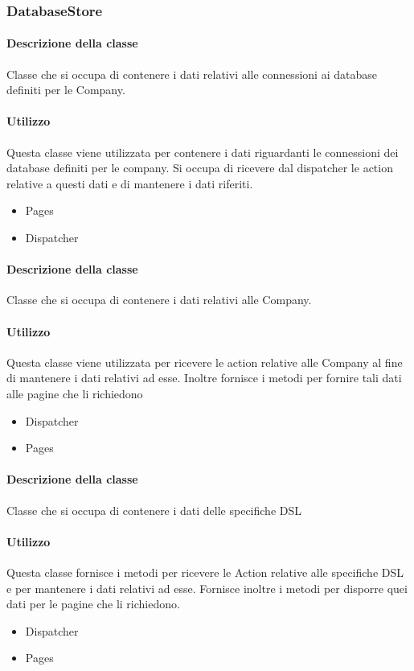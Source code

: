 \subsubsection{DatabaseStore}
\paragraph*{Descrizione della classe}
Classe che si occupa di contenere i dati relativi alle connessioni ai database definiti per le Company.
\paragraph*{Utilizzo}
Questa classe viene utilizzata per contenere i dati riguardanti le connessioni dei database definiti per le company. Si occupa di ricevere dal dispatcher le action relative a questi dati e di mantenere i dati riferiti.
\begin{itemize}
\item Pages
\item Dispatcher
\end{itemize}

\paragraph*{Descrizione della classe}
Classe che si occupa di contenere i dati relativi alle Company.
\paragraph*{Utilizzo}
Questa classe viene utilizzata per ricevere le action relative alle Company al fine di mantenere i dati relativi ad esse. Inoltre fornisce i metodi per fornire tali dati alle pagine che li richiedono
\begin{itemize}
\item Dispatcher
\item Pages
\end{itemize}

\paragraph*{Descrizione della classe}
Classe che si occupa di contenere i dati delle specifiche DSL
\paragraph*{Utilizzo}
Questa classe fornisce i metodi per ricevere le Action relative alle specifiche DSL e per mantenere i dati relativi ad esse. Fornisce inoltre i metodi per disporre quei dati per le pagine che li richiedono.
\begin{itemize}
\item Dispatcher
\item Pages
\end{itemize}


